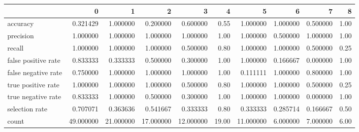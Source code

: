 \begin{tabular}{lrrrrrrrrr}
\toprule
{} &          0 &          1 &          2 &          3 &      4 &          5 &         6 &         7 &     8 \\
\midrule
accuracy            &   0.321429 &   1.000000 &   0.200000 &   0.600000 &   0.55 &   1.000000 &  1.000000 &  0.500000 &  1.00 \\
precision           &   1.000000 &   1.000000 &   1.000000 &   1.000000 &   1.00 &   1.000000 &  0.500000 &  1.000000 &  1.00 \\
recall              &   1.000000 &   1.000000 &   1.000000 &   0.500000 &   0.80 &   1.000000 &  1.000000 &  0.500000 &  0.25 \\
false positive rate &   0.833333 &   0.333333 &   0.500000 &   0.300000 &   1.00 &   1.000000 &  0.166667 &  0.000000 &  1.00 \\
false negative rate &   0.750000 &   1.000000 &   1.000000 &   1.000000 &   1.00 &   0.111111 &  1.000000 &  0.800000 &  1.00 \\
true positive rate  &   1.000000 &   1.000000 &   1.000000 &   0.500000 &   0.80 &   1.000000 &  1.000000 &  0.500000 &  0.25 \\
true negative rate  &   0.833333 &   1.000000 &   0.500000 &   0.300000 &   1.00 &   1.000000 &  1.000000 &  0.000000 &  1.00 \\
selection rate      &   0.707071 &   0.363636 &   0.541667 &   0.333333 &   0.80 &   0.333333 &  0.285714 &  0.166667 &  0.50 \\
count               &  49.000000 &  21.000000 &  17.000000 &  12.000000 &  19.00 &  11.000000 &  6.000000 &  7.000000 &  6.00 \\
\bottomrule
\end{tabular}
